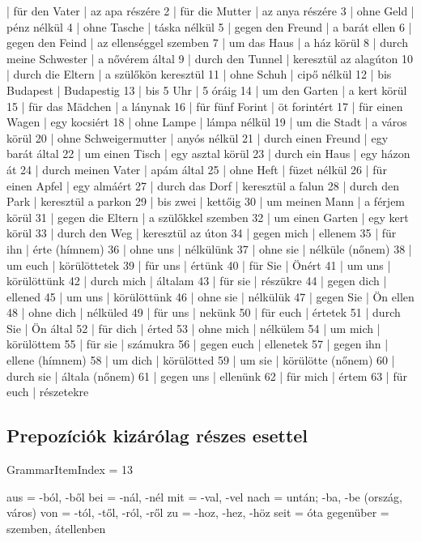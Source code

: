 \documentclass{article}
\newenvironment{desc}{\verbatim}{\endverbatim}
\newenvironment{exmp}{\verbatim}{\endverbatim}
\begin{document}
\begin{exmp}
1 | für den Vater | az apa részére
2 | für die Mutter | az anya részére
3 | ohne Geld | pénz nélkül
4 | ohne Tasche | táska nélkül
5 | gegen den Freund | a barát ellen
6 | gegen den Feind | az ellenséggel szemben
7 | um das Haus | a ház körül
8 | durch meine Schwester | a nővérem által
9 | durch den Tunnel | keresztül az alagúton
10 | durch die Eltern | a szülőkön keresztül
11 | ohne Schuh | cipő nélkül
12 | bis Budapest | Budapestig
13 | bis 5 Uhr | 5 óráig
14 | um den Garten | a kert körül
15 | für das Mädchen | a lánynak
16 | für fünf Forint | öt forintért
17 | für einen Wagen | egy kocsiért
18 | ohne Lampe | lámpa nélkül
19 | um die Stadt | a város körül
20 | ohne Schweigermutter | anyós nélkül
21 | durch einen Freund | egy barát által
22 | um einen Tisch | egy asztal körül
23 | durch ein Haus | egy házon át
24 | durch meinen Vater | apám által
25 | ohne Heft | füzet nélkül
26 | für einen Apfel | egy almáért
27 | durch das Dorf | keresztül a falun
28 | durch den Park | keresztül a parkon
29 | bis zwei | kettőig
30 | um meinen Mann | a férjem körül
31 | gegen die Eltern | a szülőkkel szemben
32 | um einen Garten | egy kert körül
33 | durch den Weg | keresztül az úton
34 | gegen mich | ellenem
35 | für ihn | érte (hímnem)
36 | ohne uns | nélkülünk
37 | ohne sie | nélküle (nőnem)
38 | um euch | körülöttetek
39 | für uns | értünk
40 | für Sie | Önért
41 | um uns | körülöttünk
42 | durch mich | általam
43 | für sie | részükre
44 | gegen dich | ellened
45 | um uns | körülöttünk
46 | ohne sie | nélkülük
47 | gegen Sie | Ön ellen
48 | ohne dich | nélküled
49 | für uns | nekünk
50 | für euch | értetek
51 | durch Sie | Ön által
52 | für dich | érted
53 | ohne mich | nélkülem
54 | um mich | körülöttem
55 | für sie | számukra
56 | gegen euch | ellenetek
57 | gegen ihn | ellene (hímnem)
58 | um dich | körülötted
59 | um sie | körülötte (nőnem)
60 | durch sie | általa (nőnem)
61 | gegen uns | ellenünk
62 | für mich | értem
63 | für euch | részetekre
\end{exmp}

\subsection{Prepozíciók kizárólag részes esettel}

GrammarItemIndex = 13

\begin{desc}
aus = -ból, -ből
bei = -nál, -nél
mit = -val, -vel
nach = untán; -ba, -be (ország, város)
von = -tól, -től, -ról, -ről
zu = -hoz, -hez, -höz
seit = óta
gegenüber = szemben, átellenben
\end{desc}
\end{document}

